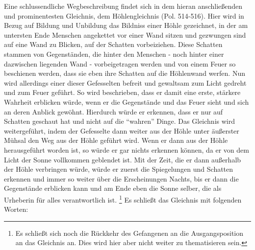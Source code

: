 Eine schlussendliche Wegbeschreibung findet sich in dem hieran anschließenden und prominentesten Gleichnis, dem Höhlengleichnis (Pol. 514-516).
Hier wird in Bezug auf Bildung und Unbildung das Bildniss einer Höhle gezeichnet, in der am untersten Ende Menschen angekettet vor einer Wand sitzen und gezwungen sind auf eine Wand zu Blicken, auf der Schatten vorbeiziehen. Diese Schatten stammen von Gegenständen, die hinter den Menschen - noch hinter einer dazwischen liegenden Wand - vorbeigetragen werden und von einem Feuer so beschienen werden, dass sie eben ihre Schatten auf die Höhlenwand werfen. Nun wird allerdings einer dieser Gefesselten befreit und gewaltsam zum Licht gedreht und zum Feuer geführt. So wird beschrieben, dass er damit eine erste, stärkere Wahrheit erblicken würde, wenn er die Gegenstände und das Feuer sieht und sich an deren Anblick gewöhnt. Hierdurch würde er erkennen, dass er nur auf Schatten geschaut hat und nicht auf die \enquote{wahren} Dinge. Das Gleichnis wird weitergeführt, indem der Gefesselte dann weiter aus der Höhle unter äußerster Mühsal den Weg aus der Höhle geführt wird. Wenn er dann aus der Höhle herausgeführt worden ist, so würde er gar nichts erkennen können, da er von dem Licht der Sonne vollkommen geblendet ist. Mit der Zeit, die er dann außerhalb der Höhle verbringen würde, würde er zuerst die Spiegelungen und Schatten erkennen und immer so weiter über die Erscheinungen Nachts, bis er dann die Gegenstände erblicken kann und am Ende eben die Sonne selber, die als Urheberin für alles verantwortlich ist. \footnote{Es schließt sich noch die Rückkehr des Gefangenen an die Ausgangsposition an das Gleichnis an. Dies wird hier aber nicht weiter zu thematisieren sein.} Es schließt das Gleichnis mit folgenden Worten:
